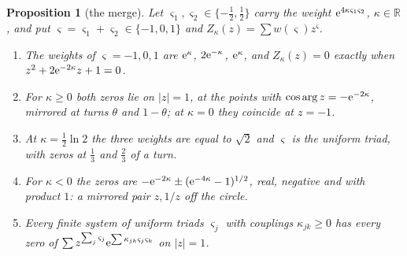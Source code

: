\documentclass[11pt]{article}
\newtheorem{proposition}[theorem]{Proposition}
\theoremstyle{definition}\newtheorem{definition}[theorem]{Definition}
\theoremstyle{remark}\newtheorem{remark}[theorem]{Remark}
\newcommand{\R}{\mathbb R}\newcommand{\C}{\mathbb C}\newcommand{\N}{\mathbb N}
\begin{document}
\begin{proposition}[the merge]\label{prop:merge}
Let $\varsigma_1,\varsigma_2\in\{-\frac12,\frac12\}$ carry the weight $\mathrm e^{4\kappa\varsigma_1\varsigma_2}$, $\kappa\in\R$, and put $\varsigma=\varsigma_1+\varsigma_2\in\{-1,0,1\}$ and $Z_\kappa(z)=\sum w(\varsigma)z^\varsigma$.
\begin{enumerate}[label=(\alph*)]
\item The weights of $\varsigma=-1,0,1$ are $\mathrm e^\kappa$, $2\mathrm e^{-\kappa}$, $\mathrm e^\kappa$, and $Z_\kappa(z)=0$ exactly when $z^2+2\mathrm e^{-2\kappa}z+1=0$.
\item For $\kappa\ge0$ both zeros lie on $|z|=1$, at the points with $\cos\arg z=-\mathrm e^{-2\kappa}$, mirrored at turns $\theta$ and $1-\theta$; at $\kappa=0$ they coincide at $z=-1$.
\item At $\kappa=\frac12\ln2$ the three weights are equal to $\sqrt2$ and $\varsigma$ is the uniform triad, with zeros at $\frac13$ and $\frac23$ of a turn.
\item For $\kappa<0$ the zeros are $-\mathrm e^{-2\kappa}\pm(\mathrm e^{-4\kappa}-1)^{1/2}$, real, negative and with product $1$: a mirrored pair $z,1/z$ off the circle.
\item Every finite system of uniform triads $\varsigma_j$ with couplings $\kappa_{jk}\ge0$ has every zero of $\sum z^{\sum_j\varsigma_j}\mathrm e^{\sum\kappa_{jk}\varsigma_j\varsigma_k}$ on $|z|=1$.
\end{enumerate}
\end{proposition}
\end{document}
